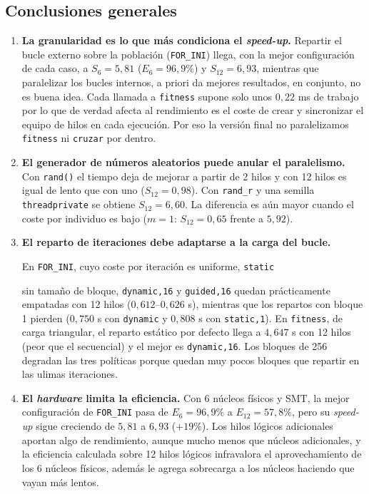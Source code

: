 \documentclass[12pt]{article}
\begin{document}
\begin{enumerate}
\subsection*{Conclusiones generales}

\begin{enumerate}
    \item \textbf{La granularidad es lo que más condiciona el \textit{speed-up}.} 
    Repartir el bucle externo sobre la población (\texttt{FOR\_INI}) llega, con la
     mejor configuración de cada caso, a $S_6 = 5{,}81$ ($E_6 = 96{,}9\%$) y $S_{12} = 6{,}93$, 
     mientras que paralelizar los bucles internos, a priori da mejores resultados, en conjunto, no es buena idea. 
     Cada llamada a \texttt{fitness} 
      supone solo unos $0{,}22$ ms de trabajo por lo que de verdad afecta al rendimiento es el coste de crear 
      y sincronizar el equipo de hilos en cada ejecución. Por eso la versión final no paralelizamos \texttt{fitness} 
      ni \texttt{cruzar} por dentro.


    \item \textbf{El generador de números aleatorios puede anular el paralelismo.} Con
     \texttt{rand()} el tiempo deja de mejorar a partir de 2 hilos y con 12 hilos es 
     igual de lento que con uno ($S_{12} = 0{,}98$). Con \texttt{rand\_r} y una semilla
      \texttt{threadprivate} se obtiene $S_{12} = 6{,}60$. La diferencia es aún mayor 
      cuando el coste por individuo es bajo ($m = 1$: $S_{12} = 0{,}65$ frente a $5{,}92$).

    \item \textbf{El reparto de iteraciones debe adaptarse a la carga del bucle.} 
    

    En \texttt{FOR\_INI}, cuyo coste por iteración es uniforme, \texttt{static}
    
    sin tamaño de bloque, \texttt{dynamic,16} y \texttt{guided,16} quedan 
    prácticamente empatadas con 12 hilos ($0{,}612$--$0{,}626$ s), mientras
     que los repartos con bloque 1 pierden ($0{,}750$ s con \texttt{dynamic} 
     y $0{,}808$ s con \texttt{static,1}). En \texttt{fitness}, de carga triangular, 
     el reparto estático por defecto llega a $4{,}647$ s con 12 hilos (peor que el 
     secuencial) y el mejor es \texttt{dynamic,16}. Los bloques de 256 degradan las 
     tres políticas porque quedan muy pocos bloques que repartir en las ulimas iteraciones.


    \item \textbf{El \textit{hardware} limita la eficiencia.} Con 6 núcleos físicos y SMT, 
    la mejor configuración de \texttt{FOR\_INI} pasa de $E_6 = 96{,}9\%$ a $E_{12} = 57{,}8\%$, 
    pero su \textit{speed-up} sigue creciendo de $5{,}81$ a $6{,}93$ ($+19\%$). Los hilos 
    lógicos adicionales aportan algo de rendimiento, aunque mucho menos que núcleos adicionales, 
    y la eficiencia calculada sobre 12 hilos lógicos infravalora el aprovechamiento de los 6 núcleos físicos, además 
    le agrega sobrecarga a los núcleos haciendo que vayan más lentos.


\end{enumerate}
\end{enumerate}
\end{document}
